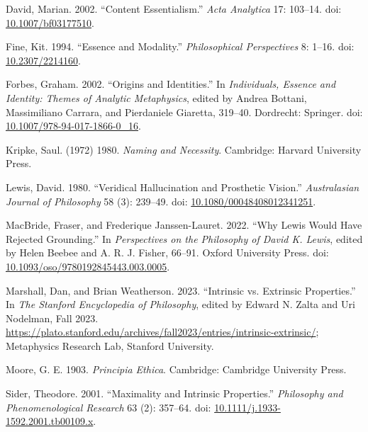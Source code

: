 \documentclass[
  11pt,
  letterpaper,
  DIV=11,
  numbers=noendperiod,
  twoside]{scrartcl}
\newlength{\cslhangindent}
\newenvironment{CSLReferences}[2] %
 {\begin{list}{}{%
  \setlength{\itemindent}{0pt}
  \setlength{\leftmargin}{0pt}
  \setlength{\parsep}{0pt}
  \ifodd #1
   \setlength{\leftmargin}{\cslhangindent}
   \setlength{\itemindent}{-1\cslhangindent}
  \fi
  \setlength{\itemsep}{#2\baselineskip}}}
 {\end{list}}
\begin{document}
\label{refs}
\begin{CSLReferences}{1}{0}
David, Marian. 2002. {``Content Essentialism.''} \emph{Acta Analytica}
17: 103--14. doi:
\href{https://doi.org/10.1007/bf03177510}{10.1007/bf03177510}.

Fine, Kit. 1994. {``Essence and Modality.''} \emph{Philosophical
Perspectives} 8: 1--16. doi:
\href{https://doi.org/10.2307/2214160}{10.2307/2214160}.

Forbes, Graham. 2002. {``Origins and Identities.''} In
\emph{Individuals, Essence and Identity: Themes of Analytic
Metaphysics}, edited by Andrea Bottani, Massimiliano Carrara, and
Pierdaniele Giaretta, 319--40. Dordrecht: Springer. doi:
\href{https://doi.org/10.1007/978-94-017-1866-0_16}{10.1007/978-94-017-1866-0\_16}.

Kripke, Saul. (1972) 1980. \emph{Naming and Necessity}. Cambridge:
Harvard University Press.

Lewis, David. 1980. {``Veridical Hallucination and Prosthetic Vision.''}
\emph{Australasian Journal of Philosophy} 58 (3): 239--49. doi:
\href{https://doi.org/10.1080/00048408012341251}{10.1080/00048408012341251}.

MacBride, Fraser, and Frederique Janssen-Lauret. 2022. {``Why Lewis
Would Have Rejected Grounding.''} In \emph{Perspectives on the
Philosophy of {D}avid {K}. {L}ewis}, edited by Helen Beebee and A. R. J.
Fisher, 66--91. {O}xford {U}niversity {P}ress. doi:
\href{https://doi.org/10.1093/oso/9780192845443.003.0005}{10.1093/oso/9780192845443.003.0005}.

Marshall, Dan, and Brian Weatherson. 2023. {``{Intrinsic vs. Extrinsic
Properties}.''} In \emph{The {Stanford} Encyclopedia of Philosophy},
edited by Edward N. Zalta and Uri Nodelman, {F}all 2023.
\url{https://plato.stanford.edu/archives/fall2023/entries/intrinsic-extrinsic/};
Metaphysics Research Lab, Stanford University.

Moore, G. E. 1903. \emph{Principia Ethica}. Cambridge: Cambridge
University Press.

Sider, Theodore. 2001. {``Maximality and Intrinsic Properties.''}
\emph{Philosophy and Phenomenological Research} 63 (2): 357--64. doi:
\href{https://doi.org/10.1111/j.1933-1592.2001.tb00109.x}{10.1111/j.1933-1592.2001.tb00109.x}.


\end{CSLReferences}
\end{document}
